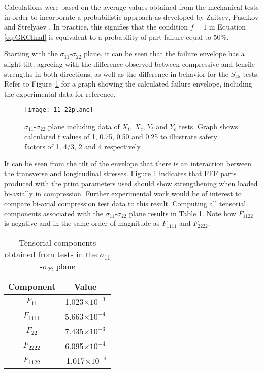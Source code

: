 \documentclass[main.tex]{subfiles}
\begin{document}
Calculations were based on the average values obtained from the mechanical tests in order to incorporate a probabilistic approach as developed by Zaitsev, Pashkov and Strelyaev \cite{Zaitsev1975}. In practice, this signifies that the condition $f=1$ in Equation \ref{eq:GKCfinal} is equivalent to a probability of part failure equal to 50\%.

Starting with the $\sigma_{11}$-$\sigma_{22}$ plane, it can be seen that the failure envelope has a slight tilt, agreeing with the difference observed between compressive and tensile strengths in both directions, as well as the difference in behavior for the $S_{45}$ tests. Refer to Figure~\ref{fig:1122plane} for a graph showing the calculated failure envelope, including the experimental data for reference.

\pagebreak

\begin{figure}[!htbp]
	\center
	\texttt{[image: 11\_22plane]}
	\captionsetup{justification=centering} %
	\caption[failure envelope in the $\sigma_{11}$-$\sigma_{22}$ plane]{$\sigma_{11}$-$\sigma_{22}$ plane including data of $X_t$, $X_c$, $Y_t$ and $Y_c$ tests. Graph shows calculated f values of 1, 0.75, 0.50 and 0.25 to illustrate safety factors of 1, 4/3, 2 and 4 respectively.} \label{fig:1122plane}
\end{figure}

It can be seen from the tilt of the envelope that there is an interaction between the transverse and longitudinal stresses. Figure \ref{fig:1122plane} indicates that FFF parts produced with the print parameters used should show strengthening when loaded bi-axially in compression. Further experimental work would be of interest to compare bi-axial compression test data to this result. Computing all tensorial components associated with the  $\sigma_{11}$-$\sigma_{22}$ plane results in Table \ref{tab:1122calc}. Note how $F_{1122}$ is negative and in the same order of magnitude as $F_{1111}$ and $F_{2222}$. 


\begin{table} [h]
	\centering
	\caption{Tensorial components obtained from tests in the $\sigma_{11}$-$\sigma_{22}$ plane}
	\begin{tabular}{ c c } 
		\toprule
		\textbf{Component} & \textbf{Value} \\
		\midrule
		$F_{11}$ & 1.023$\times 10^{-3}$\\ 
		$F_{1111}$ & 5.663$\times 10^{-4}$\\ 
		$F_{22}$ & 7.435$\times 10^{-3}$\\ 
		$F_{2222}$ & 6.095$\times 10^{-4}$\\ 
		$F_{1122}$ & -1.017$\times 10^{-4}$\\ 
		\bottomrule
	\end{tabular}
	\label{tab:1122calc}
\end{table}  
\end{document}
